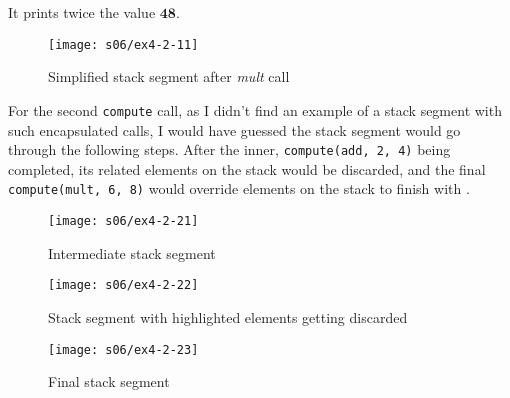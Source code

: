 
It prints twice the value $\boldsymbol{48}$.


\begin{figure}[H]
    \center
    \texttt{[image: s06/ex4-2-11]}
    \caption{Simplified stack segment after \textit{mult} call\label{fig:ex4-2-11}}
\end{figure}

\pagebreak
For the second \verb!compute! call, as I didn't find an example of a stack segment with such encapsulated calls, I would have guessed the stack segment would go through the following steps. After the inner, \verb!compute(add, 2, 4)! being completed, its related elements on the stack would be discarded, and the final \verb!compute(mult, 6, 8)! would override elements on the stack to finish with .

\begin{center}
\begin{minipage}{0.43\textwidth}
    \begin{figure}[H]
        \center
        \texttt{[image: s06/ex4-2-21]}
        \caption{Intermediate stack segment\label{fig:ex4-2-21}}
    \end{figure}
\end{minipage}%
\qquad%
\begin{minipage}{0.43\textwidth}
    \begin{figure}[H]
        \center
        \texttt{[image: s06/ex4-2-22]}
        \caption{Stack segment with highlighted elements getting discarded\label{fig:ex4-2-22}}
    \end{figure}
\end{minipage}
\end{center}

\begin{figure}[H]
    \center
    \texttt{[image: s06/ex4-2-23]}
    \caption{Final stack segment\label{fig:ex4-2-23}}
\end{figure}


